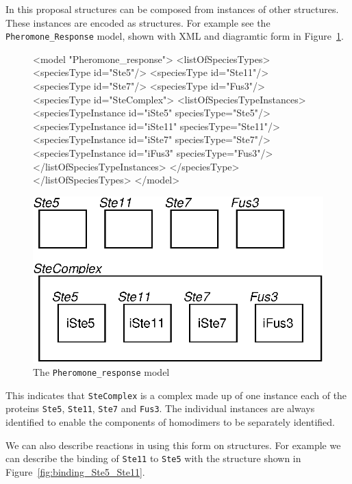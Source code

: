 \documentclass{cekarticle}
\begin{document}
In this proposal  structures can be composed from instances of other
 structures.
These instances are encoded as  structures.
For example see the \texttt{Pheromone\_Response} model, shown with XML and diagramtic form in
Figure~\ref{fig:pheromone_response}.

\begin{figure}[h]
\begin{example}
<model "Pheromone_response">
    <listOfSpeciesTypes>
        <speciesType id="Ste5"/>
        <speciesType id="Ste11"/>
        <speciesType id="Ste7"/>
        <speciesType id="Fus3"/>
        <speciesType id="SteComplex">
            <listOfSpeciesTypeInstances>
                <speciesTypeInstance id="iSte5" speciesType="Ste5"/>
                <speciesTypeInstance id="iSte11" speciesType="Ste11"/>
                <speciesTypeInstance id="iSte7" speciesType="Ste7"/>
                <speciesTypeInstance id="iFus3" speciesType="Fus3"/>
            </listOfSpeciesTypeInstances>
        </speciesType>
    </listOfSpeciesTypes>
</model>
\end{example}
  \vspace*{8pt}
  \centering
  \includegraphics[scale = 0.7]{pheromone_response.eps}
  \caption{The \texttt{Pheromone\_response} model}
  \label{fig:pheromone_response}
\end{figure}

This indicates that \texttt{SteComplex}
is a complex made up of one instance each of the proteins \texttt{Ste5}, \texttt{Ste11}, \texttt{Ste7}
and \texttt{Fus3}.  The individual instances are always identified to enable the components of homodimers
to be separately identified.

We can also describe reactions in using this form on  structures.  For example
we can describe the binding of \texttt{Ste11} to \texttt{Ste5} with the 
structure shown in Figure~\ref{fig:binding_Ste5_Ste11}.
\end{document}
